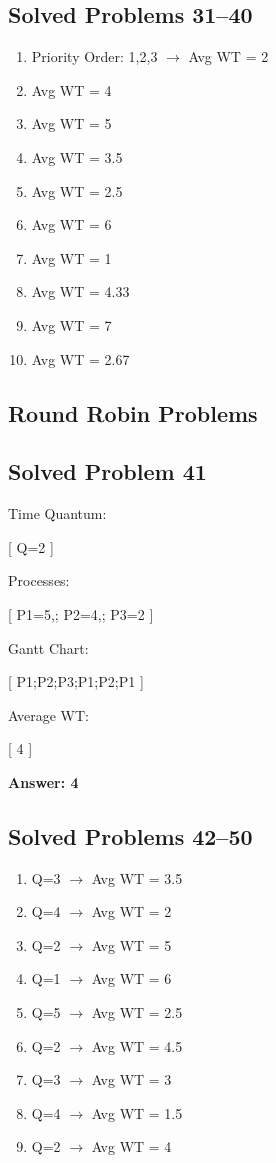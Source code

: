 \subsection{Solved Problems 31--40}

\begin{enumerate}
\item Priority Order: 1,2,3 $\rightarrow$ Avg WT = 2
\item Avg WT = 4
\item Avg WT = 5
\item Avg WT = 3.5
\item Avg WT = 2.5
\item Avg WT = 6
\item Avg WT = 1
\item Avg WT = 4.33
\item Avg WT = 7
\item Avg WT = 2.67
\end{enumerate}

\subsection{Round Robin Problems}

\subsection{Solved Problem 41}

Time Quantum:

[
Q=2
]

Processes:

[
P1=5,;
P2=4,;
P3=2
]

Gantt Chart:

[
P1;P2;P3;P1;P2;P1
]

Average WT:

[
4
]

\textbf{Answer: 4}

\subsection{Solved Problems 42--50}

\begin{enumerate}
\item Q=3 $\rightarrow$ Avg WT = 3.5
\item Q=4 $\rightarrow$ Avg WT = 2
\item Q=2 $\rightarrow$ Avg WT = 5
\item Q=1 $\rightarrow$ Avg WT = 6
\item Q=5 $\rightarrow$ Avg WT = 2.5
\item Q=2 $\rightarrow$ Avg WT = 4.5
\item Q=3 $\rightarrow$ Avg WT = 3
\item Q=4 $\rightarrow$ Avg WT = 1.5
\item Q=2 $\rightarrow$ Avg WT = 4
\end{enumerate}

